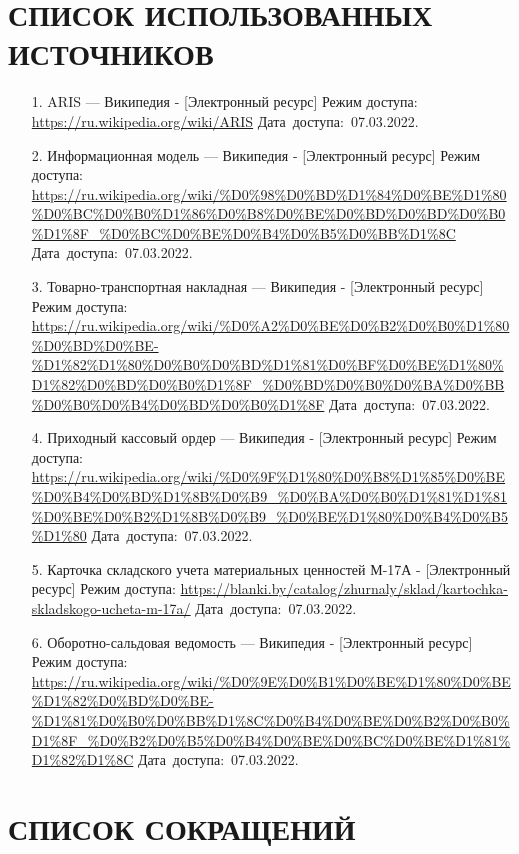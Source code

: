 \documentclass[12pt, a4paper, simple]{eskdtext}
\begin{document}
    \section*{СПИСОК ИСПОЛЬЗОВАННЫХ ИСТОЧНИКОВ}
    \begin{enumerate}    
        \item[1.] ARIS — Википедия
        - [Электронный ресурс]
        Режим доступа: \url{https://ru.wikipedia.org/wiki/ARIS}
        Дата~доступа:~07.03.2022.
        \item[2.] Информационная модель — Википедия
        - [Электронный ресурс]
        Режим доступа: \url{https://ru.wikipedia.org/wiki/%D0%98%D0%BD%D1%84%D0%BE%D1%80%D0%BC%D0%B0%D1%86%D0%B8%D0%BE%D0%BD%D0%BD%D0%B0%D1%8F_%D0%BC%D0%BE%D0%B4%D0%B5%D0%BB%D1%8C}
        Дата~доступа:~07.03.2022.
        \item[3.] Товарно-транспортная накладная — Википедия
        - [Электронный ресурс]
        Режим доступа: \url{https://ru.wikipedia.org/wiki/%D0%A2%D0%BE%D0%B2%D0%B0%D1%80%D0%BD%D0%BE-%D1%82%D1%80%D0%B0%D0%BD%D1%81%D0%BF%D0%BE%D1%80%D1%82%D0%BD%D0%B0%D1%8F_%D0%BD%D0%B0%D0%BA%D0%BB%D0%B0%D0%B4%D0%BD%D0%B0%D1%8F}
        Дата~доступа:~07.03.2022.
        \item[4.] Приходный кассовый ордер — Википедия
        - [Электронный ресурс]
        Режим доступа: \url{https://ru.wikipedia.org/wiki/%D0%9F%D1%80%D0%B8%D1%85%D0%BE%D0%B4%D0%BD%D1%8B%D0%B9_%D0%BA%D0%B0%D1%81%D1%81%D0%BE%D0%B2%D1%8B%D0%B9_%D0%BE%D1%80%D0%B4%D0%B5%D1%80}
        Дата~доступа:~07.03.2022.
        \item[5.] Карточка складского учета материальных ценностей М-17А 
        - [Электронный ресурс]
        Режим доступа: \url{https://blanki.by/catalog/zhurnaly/sklad/kartochka-skladskogo-ucheta-m-17a/}
        Дата~доступа:~07.03.2022.
        \item[6.] Оборотно-сальдовая ведомость — Википедия
        - [Электронный ресурс]
        Режим доступа: \url{https://ru.wikipedia.org/wiki/%D0%9E%D0%B1%D0%BE%D1%80%D0%BE%D1%82%D0%BD%D0%BE-%D1%81%D0%B0%D0%BB%D1%8C%D0%B4%D0%BE%D0%B2%D0%B0%D1%8F_%D0%B2%D0%B5%D0%B4%D0%BE%D0%BC%D0%BE%D1%81%D1%82%D1%8C}
        Дата~доступа:~07.03.2022.
    \end{enumerate}
    \newpage

    \newpage
    \section*{СПИСОК СОКРАЩЕНИЙ}
    
\end{document}
